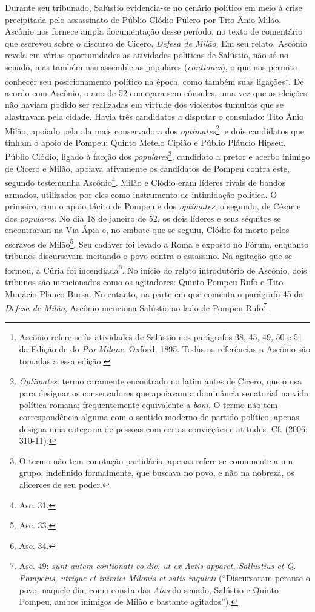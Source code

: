 Durante seu tribunado, Salústio evidencia-se no cenário político em meio à
crise precipitada pelo assassinato de Públio Clódio Pulcro por Tito Ânio Milão.
Ascônio nos fornece ampla documentação desse período, no texto de comentário
que escreveu sobre o discurso de Cícero, \emph{Defesa de Milão}. Em seu relato,
Ascônio revela em várias oportunidades as atividades políticas de Salústio, não
só no senado, mas também nas assembleias populares (\emph{contiones}), o que
nos permite conhecer seu posicionamento político na época, como também suas
ligações\footnote{Ascônio refere-se às atividades de Salústio nos parágrafos
38, 45, 49, 50 e 51 da Edição de  do \emph{Pro Milone}, Oxford, 1895.
Todas as referências a Ascônio são tomadas a essa edição.}.
De acordo com Ascônio, o ano de 52 começara sem cônsules, uma vez que as
eleições não haviam podido ser realizadas em virtude dos violentos tumultos que
se alastravam pela cidade. Havia três candidatos a disputar o consulado: Tito
Ânio Milão, apoiado pela ala mais conservadora dos \emph{optimates}\footnote{\emph{Optimates}: termo raramente encontrado no latim antes de Cicero, que o
usa para designar os conservadores que apoiavam a dominância senatorial na vida
política romana; frequentemente equivalente a \emph{boni}. O termo não tem
correspondência alguma com o sentido moderno de partido político, apenas
designa uma categoria de pessoas com certas convicções e atitudes. Cf. 
(2006: 310-11).}, e dois candidatos que tinham o apoio de Pompeu: Quinto
Metelo Cipião e Públio Pláucio Hipseu. Públio Clódio, ligado à facção dos
\emph{populares}\footnote{O termo não tem conotação partidária, apenas
refere-se comumente a um grupo, indefinido formalmente, que buscava no povo, e não na nobreza, os alicerces de seu poder.}, candidato a pretor e acerbo inimigo de Cícero e Milão,  apoiava
ativamente os candidatos de Pompeu contra este, segundo testemunha
Ascônio\footnote{Asc. 31.}.  Milão e Clódio eram líderes rivais de bandos
armados, utilizados por eles como instrumento de intimidação política.  O
primeiro, com o apoio tácito de Pompeu e dos \emph{optimates}, o segundo, de
César e dos \emph{populares}. No dia 18 de janeiro de 52, os dois líderes e
seus séquitos se encontraram na Via Ápia e, no embate que se seguiu, Clódio foi
morto pelos escravos de Milão\footnote{Asc. 33.}. Seu cadáver foi levado a
Roma e exposto no Fórum, enquanto tribunos discursavam incitando o povo contra
o assassino. Na agitação que se formou, a Cúria foi incendiada\footnote{Asc. 34.}.
No início do relato introdutório de Ascônio, dois tribunos são mencionados como
os agitadores: Quinto Pompeu Rufo e Tito Munácio Planco Bursa.  No entanto, na
parte em que comenta o parágrafo 45 da \emph{Defesa de Milão}, Ascônio menciona
Salústio ao lado de Pompeu Rufo\footnote{ Asc. 49: \emph{sunt autem contionati
eo die, ut ex Actis apparet, Sallustius et Q. Pompeius, utrique et inimici
Milonis et satis inquieti} (``Discursaram perante o povo, naquele dia, como consta das \emph{Atas} do senado, Salústio e Quinto Pompeu, ambos inimigos de Milão e bastante
agitados'').}.

